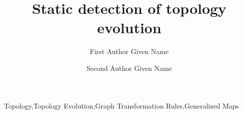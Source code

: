 \documentclass[times,twocolumn,final]{els-format/elsarticle}
\begin{document}

\begin{frontmatter}

\title{Static detection of topology evolution}%

\author[1]{First Author Given Name }

\author[2]{Second Author Given Name }

\address[1]{Address, City, Postcode, Country}
\address[2]{Address, City, Postcode, Country}

\received{\today}


\begin{abstract}
\lipsum[1]
\end{abstract}

\begin{keyword}
\KWD Topology\sep Topology Evolution\sep Graph Transformation Rules\sep Generalized Maps
\end{keyword}

\end{frontmatter}

\linenumbers








\end{document}
